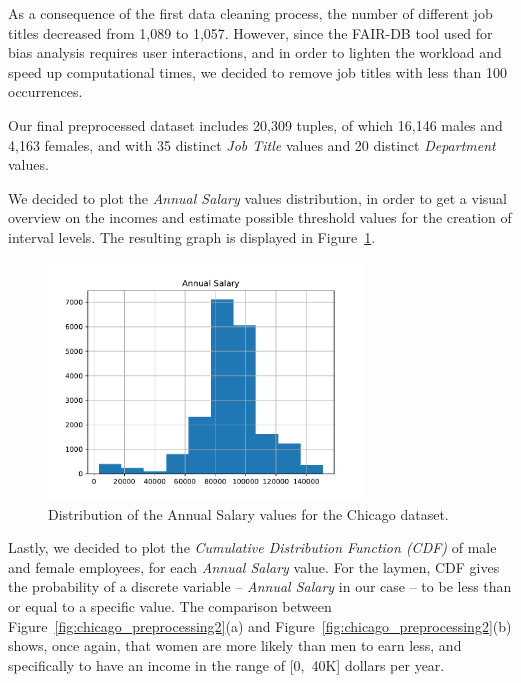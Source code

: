 As a consequence of the first data cleaning process, the number of different job titles decreased from 1,089 to 1,057. However, since the FAIR-DB tool used for bias analysis requires user interactions, and in order to lighten the workload and speed up computational times, we decided to remove job titles with less than 100 occurrences.

Our final preprocessed dataset includes 20,309 tuples, of which 16,146 males and 4,163 females, and with 35 distinct \textit{Job Title} values and 20 distinct \textit{Department} values.

We decided to plot the \textit{Annual Salary} values distribution, in order to get a visual overview on the incomes and estimate possible threshold values for the creation of interval levels. The resulting graph is displayed in Figure~\ref{fig:chicago_preprocessing1}.

\begin{figure}[t!]
\centering
\includegraphics[width=0.75\textwidth]{figures/chicago_annual_salary_distribution.pdf}
\caption{Distribution of the \textrm{Annual Salary} values for the Chicago dataset.}
\label{fig:chicago_preprocessing1}
\end{figure}

Lastly, we decided to plot the \textit{Cumulative Distribution Function (CDF)} of male and female employees, for each \textit{Annual Salary} value. For the laymen, CDF gives the probability of a discrete variable -- \textit{Annual Salary} in our case -- to be less than or equal to a specific value. The comparison between Figure~\ref{fig:chicago_preprocessing2}(a) and Figure~\ref{fig:chicago_preprocessing2}(b) shows, once again, that women are more likely than men to earn less, and specifically to have an income in the range of [0,~40K] dollars per year.

